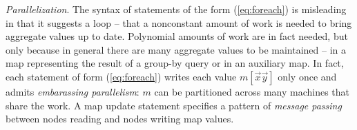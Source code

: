 {\em Parallelization}.
The syntax of statements of the form (\ref{eq:foreach})
is misleading in that it suggests a loop --
that a nonconstant amount of work is needed to bring aggregate
values up to date. Polynomial amounts of work are in fact needed,
but only because in general there are many aggregate values
to be maintained -- in a
map representing the result of a group-by query or in an auxiliary map.
In fact, each statement of form (\ref{eq:foreach})
writes each value $m[\vec{x}\vec{y}]$ only once and admits
{\em embarassing parallelism}: $m$ can be partitioned across many machines
that share the work. A map update statement specifies a
pattern of {\em message passing} between nodes reading and nodes writing
map values.



